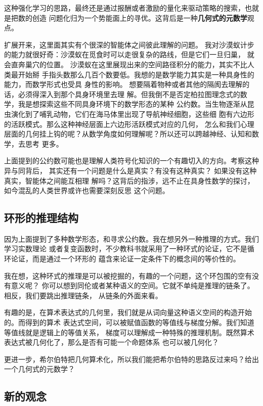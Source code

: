 \documentclass[a4paper,12pt]{article}
\numberwithin{problem}{section}
\numberwithin{definition}{section}
\numberwithin{lemma}{section}
\numberwithin{proposition}{section}
\numberwithin{theorem}{section}
\numberwithin{grammar}{section}
\numberwithin{program}{section}
\numberwithin{convention}{section}
\numberwithin{corollary}{section}
\begin{document}
这种强化学习的思路，最终还是通过报酬或者激励的量化来驱动策略的搜索，也就是把数的创造
问题化归为一个势能面上的寻优。这背后是一种\textbf{几何式的元数学}观点。

扩展开来，这里面其实有个很深的智能体之间彼此理解的问题。
我对沙漠蚁计步的能力就很好奇：沙漠蚁在觅食时可以走很复杂的路线，但是它们一旦归巢，
就会直奔巢穴的位置。 沙漠蚁在这里展现出来的空间路径积分的能力，其实不比人类最开始掰
手指头数那么几百个数要低。我想的是数学能力其实是一种具身性的能力，而数学形式也受具
身性的影响。 想要隔着物种或者其他的隔阂去理解的话，必须得深入到那个具身环境里去理
解。但我倒不是否定柏拉图理念式的数学，我是想探索这些不同具身环境下的数学形态的某种
公约数。当生物逐渐从昆虫演化到了哺乳动物，它们在海马体里出现了导航神经细胞，这些细
胞有六边形的活跃模式。那么这种神经层面上六边形活跃模式对应的几何， 怎么和我们心理
层面的几何挂上钩的呢？从数学角度如何理解呢？所以还可以跨越神经、认知和数学，去思考
更多。

上面提到的公约数可能也是理解人类符号化知识的一个有趣切入的方向。考察这种异与同背后，
其实还有一个问题是什么是真实？有没有这种真实？ 如果没有这种真实，智能体之间能互相理
解吗？这背后的指涉，远不止在具身性数学的探讨，如今混乱的人类世界或许也需要深刻反思
这个问题。

\subsection{环形的推理结构}

因为上面提到了多种数学形态，和寻求公约数。我在想另外一种推理的方式。我们学习实数理论
或者复变函数时，不少教科书就采用了一种环式的论证，它不是循环论证，而是通过一个环形的
蕴含来论证一定条件下的概念间的等价性的。

我在想，这种环式的推理是可以被挖掘的，有趣的一个问题，这个环包围的空有没有意义呢？
你可以想到同伦或者某种语义的空间。它就不单纯是推理的链条了。相反，我们要跳出推理链条，
从链条的外面来看。

有趣的是，在算术表达式的几何里，我们就是从词向量这种语义空间的构造开始的。而得到的算术
表达式空间，可以被赋值函数的等值线与梯度分解。我们知道等值线就是逻辑上的等值关系，
梯度可以理解成一种特殊的推理机制。既然算术表达式被几何化了，那么是否有可能一个命题体系
也可以被几何化？

更进一步，希尔伯特把几何算术化，所以我们能把希尔伯特的思路反过来吗？给出一个几何式的元数学？

\subsection{新的观念}\label{subsec:newidea}
\end{document}
